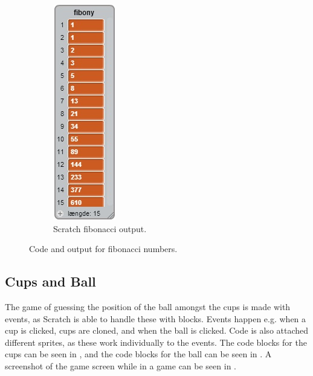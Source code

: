 \begin{figure}[h]
\begin{subfigure}[b]{0.45\textwidth}
\begin{center}
      \includegraphics[scale=0.6]{./pics/scratch_fibo_out}
      \caption{Scratch fibonacci output.}
      \label{fig:scratch_fibo_out}
    \end{center}
    \end{subfigure}
    \caption{Code and output for fibonacci numbers.}
    \label{fig:scratch_fibo}
\end{figure}

\subsection{Cups and Ball}
The game of guessing the position of the ball amongst the cups is made with events, as Scratch is able to handle these with blocks. Events happen e.g. when a cup is clicked, cups are cloned, and when the ball is clicked. Code is also attached different sprites, as these work individually to the events. The code blocks for the cups can be seen in , and the code blocks for the ball can be seen in . A screenshot of the game screen while in a game can be seen in .

